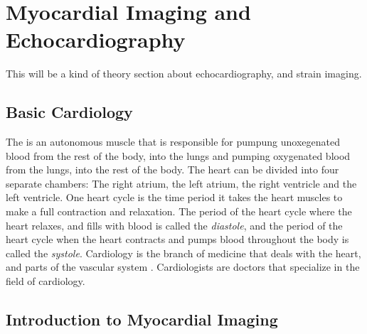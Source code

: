 \chapter{Myocardial Imaging and Echocardiography} \label{chap:strain}
\begin{comment}
[ ] Short about cardiology and echocardiography history
[ ] Short about the heart, and its anatomy
[ ] Even shorter about ultrasound, the different views, and what parts of the heart can be seen in them.
[ ] Method for extracting strain curves from ultrasound videos.
[ ] Explain the different diagnosises that will be encountered in this thesis.
[ ] Explain anatomical reasoning for why symptoms for certain diagnosis are evident in strain curves.
[ ] Summarize chapter
\end{comment}

This will be a kind of theory section about echocardiography, and strain imaging. \bigskip

\section{Basic Cardiology}
\begin{comment}
[ ] Short about cardiology and echocardiography history
[ ] Short about the heart, and its anatomy
\end{comment}
The is an autonomous muscle that is responsible for pumpung unoxegenated blood from the rest of the body, into the lungs and pumping oxygenated blood from the lungs, into the rest of the body. The heart can be divided into four separate chambers: The right atrium, the left atrium, the right ventricle and the left ventricle. One heart cycle is the time period it takes the heart muscles to make a full contraction and relaxation. The period of the heart cycle where the heart relaxes, and fills with blood is called the \textit{diastole}, and the period of the heart cycle when the heart contracts and pumps blood throughout the body is called the \textit{systole}. Cardiology is the branch of medicine that deals with the heart, and parts of the vascular system \cite{cardiology_wikipedia}. Cardiologists are doctors that specialize in the field of cardiology. 

\section{Introduction to Myocardial Imaging}
\begin{comment}
[ ] Even shorter about ultrasound, the different views, and what parts of the heart can be seen in them.
\end{comment}

